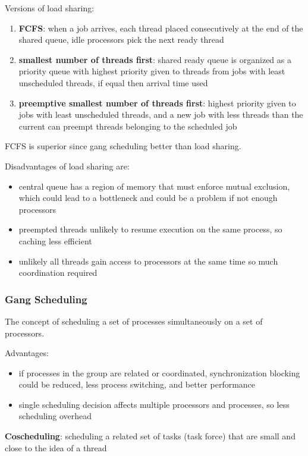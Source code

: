 \documentclass[11pt]{article}
\begin{document}
Versions of load sharing:
\begin{enumerate}
\item \textbf{FCFS}: when a job arrives, each thread placed consecutively at the end of the
shared queue, idle processors pick the next ready thread
\item \textbf{smallest number of threads first}: shared ready queue is organized as a
priority queue with highest priority given to threads from jobs with least
unscheduled threads, if equal then arrival time used
\item \textbf{preemptive smallest number of threads first}: highest priority given to
jobs with least unscheduled threads, and a new job with less threads than
the current can preempt threads belonging to the scheduled job
\end{enumerate}

FCFS is superior since gang scheduling better than load sharing.

Disadvantages of load sharing are:
\begin{itemize}
\item central queue has a region of memory that must enforce mutual exclusion,
which could lead to a bottleneck and could be a problem if not enough
processors
\item preempted threads unlikely to resume execution on the same process, so
caching less efficient
\item unlikely all threads gain access to processors at the same time so much
coordination required
\end{itemize}
\subsubsection{Gang Scheduling}
\label{sec:org7a99a7f}
The concept of scheduling a set of processes simultaneously on a set of
processors.

Advantages:
\begin{itemize}
\item if processes in the group are related or coordinated, synchronization blocking
could be reduced, less process switching, and better performance
\item single scheduling decision affects multiple processors and processes, so less
scheduling overhead
\end{itemize}

\textbf{Coscheduling}: scheduling a related set of tasks (task force) that are small
and close to the idea of a thread
\end{document}

